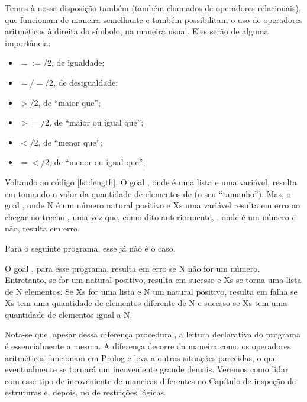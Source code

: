 \documentclass{article}
\begin{document}


Temos à nossa disposição também  (também chamados de operadores relacionais), que funcionam de
maneira semelhante e também possibilitam o uso de operadores aritméticos à direita do símbolo, na maneira usual. Eles serão de
alguma importância:

\begin{itemize}
  \item $=:=$/2, de igualdade;
  \item $=/=/2$, de desigualdade;
  \item $>/2  $, de ``maior que'';
  \item $>=/2$, de ``maior ou igual que'';
  \item $</2 $, de ``menor que'';
  \item $=</2$, de ``menor ou igual que'';
\end{itemize}



Voltando ao código \ref{lst:length}.
O goal , onde  é uma lista e  uma variável, resulta em  tomando o valor da quantidade de elementos de  (o seu ``tamanho'').  Mas, o goal , onde N é um número natural positivo e Xs uma variável resulta em erro ao chegar no trecho , uma vez que, como dito anteriormente, , onde  é um número e  não, resulta em erro.

Para o seguinte programa, esse já não é o caso.



O goal , para esse programa, resulta em erro se N não for um número. Entretanto, se for um natural positivo,  resulta em sucesso e Xs se torna uma lista de N elementos. Se Xs for uma lista e N um natural positivo,  resulta em falha se Xs tem uma quantidade de elementos diferente de N e sucesso se Xs tem uma quantidade de elementos igual a N.

Nota-se que, apesar dessa diferença procedural, a leitura declarativa do programa é essencialmente a mesma. A diferença decorre da maneira como os operadores aritméticos funcionam em Prolog e leva a outras situações parecidas, o que eventualmente se tornará um incoveniente grande demais. Veremos como lidar com esse tipo de incoveniente de maneiras diferentes no Capítulo de inspeção de estruturas %
e, depois, no de restrições lógicas. %
\end{document}
